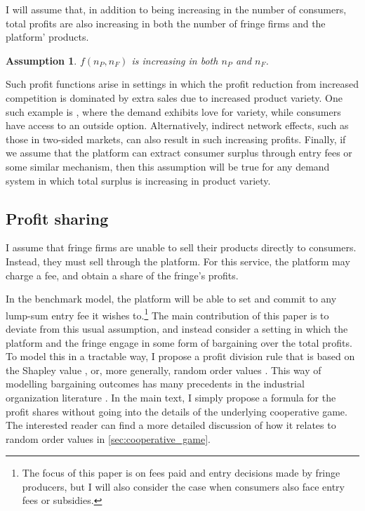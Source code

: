 \documentclass[a4paper]{article}
\newtheorem{assumption}{Assumption}
\begin{document}
I will assume that, in addition to being increasing in the number of consumers, total profits are also increasing in both the number of fringe firms and the platform' products.
\begin{assumption}
    \label{ass:monotone_profits}
    $f(n_P, n_F)$ is increasing in both $n_P$ and $n_F$.
\end{assumption}
Such profit functions arise in settings in which the profit reduction from increased competition is dominated by extra sales due to increased product variety.
One such example is \textcite{anderson2020aggregative}, where the demand exhibits love for variety, while consumers have access to an outside option.
Alternatively, indirect network effects, such as those in two-sided markets, can also result in such increasing profits.
Finally, if we assume that the platform can extract consumer surplus through entry fees or some similar mechanism, then this assumption will be true for any demand system in which total surplus is increasing in product variety.


\subsection{Profit sharing}

I assume that fringe firms are unable to sell their products directly to consumers.
Instead, they must sell through the platform.
For this service, the platform may charge a fee, and obtain a share of the fringe's profits.

In the benchmark model, the platform will be able to set and commit to any lump-sum entry fee it wishes to.\footnote{
    The focus of this paper is on fees paid and entry decisions made by fringe producers, but I will also consider the case when consumers also face entry fees or subsidies.
}
The main contribution of this paper is to deviate from this usual assumption, and instead consider a setting in which the platform and the fringe engage in some form of bargaining over the total profits.
To model this in a tractable way, I propose a profit division rule that is based on the Shapley value \parencite{shapley1953additive}, or, more generally, random order values \parencite{weber1988probabilistic}.
This way of modelling bargaining outcomes has many precedents in the industrial organization literature \parencite[e.g.][]{montez2007downstream,hart1990property,levy1997individual,inderst2003bargaining,brugemann2019intra}.
In the main text, I simply propose a formula for the profit shares without going into the details of the underlying cooperative game.
The interested reader can find a more detailed discussion of how it relates to random order values in \cref{sec:cooperative_game}.
\end{document}
